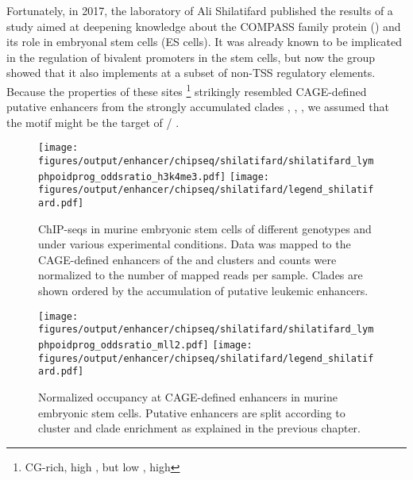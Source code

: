 Fortunately, in 2017, the laboratory of Ali Shilatifard published the results of a study aimed at deepening knowledge about the COMPASS family protein  () and its role in embryonal stem cells (ES cells)\cite{Hu2017}. It was already known to be implicated in the regulation of bivalent promoters in the stem cells\cite{Hu2013a}, but now the group showed that it also implements \hisfourthree at a subset of non-TSS regulatory elements\cite{Hu2017}. Because the properties of these sites \footnote{CG-rich, high \hisfourthree, but low \hisfourone, high \histwentysevenac} strikingly resembled CAGE-defined putative enhancers from the strongly accumulated clades , ,  , we assumed that the motif \motifmlltwo might be the target of / . 

\begin{figure}[!htb]
	\centering
	\texttt{[image: figures/output/enhancer/chipseq/shilatifard/shilatifard\_lymphpoidprog\_oddsratio\_h3k4me3.pdf]} 
	\texttt{[image: figures/output/enhancer/chipseq/shilatifard/legend\_shilatifard.pdf]} 
	\caption{\hisfourthree ChIP-seqs in murine embryonic stem cells of different genotypes and under various experimental conditions. Data was mapped to the CAGE-defined enhancers of the \amitthree and \amitseven clusters and counts were normalized to the number of mapped reads per sample. Clades are shown ordered by the accumulation of putative leukemic enhancers.}
	\label{fig:enhancers:motifs:shilatifard_lymphpoidprog_oddsratio_h3k4me3}
\end{figure}

\begin{figure}[!p]
	\centering
	\texttt{[image: figures/output/enhancer/chipseq/shilatifard/shilatifard\_lymphpoidprog\_oddsratio\_mll2.pdf]} 
	\texttt{[image: figures/output/enhancer/chipseq/shilatifard/legend\_shilatifard.pdf]} 
	\caption{Normalized  occupancy at CAGE-defined enhancers in murine embryonic stem cells. Putative enhancers are split according to cluster and clade enrichment as explained in the previous chapter.}
	\label{fig:enhancers:motifs:shilatifard_lymphpoidprog_oddsratio_mll2}
\end{figure}

